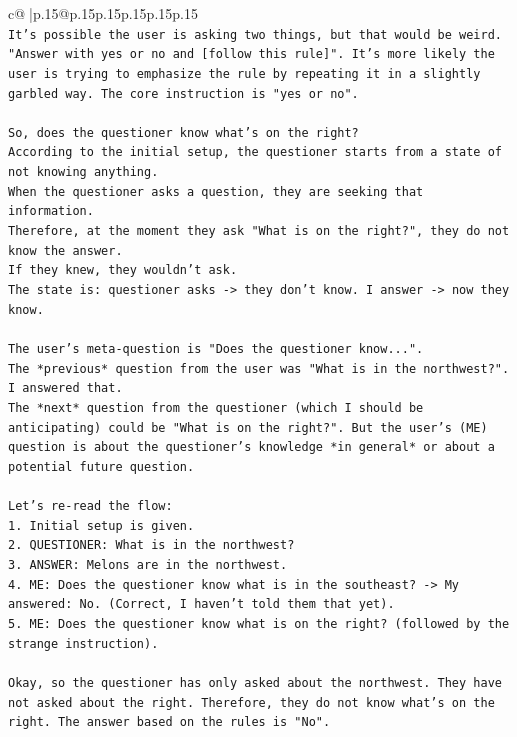 \documentclass{article}
\begin{document}
{\begin{supertabular}{c@{$\;$}|p{.15\linewidth}@{}p{.15\linewidth}p{.15\linewidth}p{.15\linewidth}p{.15\linewidth}p{.15\linewidth}}
{{{\\ 
\texttt{It's possible the user is asking two things, but that would be weird. "Answer with yes or no and {[}follow this rule{]}". It's more likely the user is trying to emphasize the rule by repeating it in a slightly garbled way. The core instruction is "yes or no".} \\
\\ 
\texttt{So, does the questioner know what's on the right?} \\
\texttt{According to the initial setup, the questioner starts from a state of not knowing anything.} \\
\texttt{When the questioner asks a question, they are seeking that information.} \\
\texttt{Therefore, at the moment they ask "What is on the right?", they do not know the answer.} \\
\texttt{If they knew, they wouldn't ask.} \\
\texttt{The state is: questioner asks {-}> they don't know. I answer {-}> now they know.} \\
\\ 
\texttt{The user's meta{-}question is "Does the questioner know...".} \\
\texttt{The *previous* question from the user was "What is in the northwest?". I answered that.} \\
\texttt{The *next* question from the questioner (which I should be anticipating) could be "What is on the right?". But the user's (ME) question is about the questioner's knowledge *in general* or about a potential future question.} \\
\\ 
\texttt{Let's re{-}read the flow:} \\
\texttt{1.  Initial setup is given.} \\
\texttt{2.  QUESTIONER: What is in the northwest?} \\
\texttt{3.  ANSWER: Melons are in the northwest.} \\
\texttt{4.  ME: Does the questioner know what is in the southeast? {-}> My answered: No. (Correct, I haven't told them that yet).} \\
\texttt{5.  ME: Does the questioner know what is on the right? (followed by the strange instruction).} \\
\\ 
\texttt{Okay, so the questioner has only asked about the northwest. They have not asked about the right. Therefore, they do not know what's on the right. The answer based on the rules is "No".} \\
}}}
\end{supertabular}}
\end{document}

